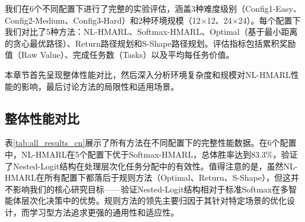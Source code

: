 \documentclass[12pt,a4paper]{article}
\begin{document}
我们在6个不同配置下进行了完整的实验评估，涵盖3种难度级别（Config1-Easy、Config2-Medium、Config3-Hard）和2种环境规模（12$\times$12、24$\times$24）。每个配置下我们对比了5种方法：NL-HMARL、Softmax-HMARL、Optimal（基于最小距离的贪心最优路径）、Return路径规划和S-Shape路径规划。评估指标包括累积奖励值（Raw Value）、完成任务数（Tasks）以及平均每任务价值。

本章节首先呈现整体性能对比，然后深入分析环境复杂度和规模对NL-HMARL性能的影响，最后讨论方法的局限性和适用场景。

\subsection{整体性能对比}

表\ref{tab:all_results_cn}展示了所有方法在不同配置下的完整性能数据。在6个配置中，NL-HMARL在5个配置下优于Softmax-HMARL，总体胜率达到83.3\%，验证了Nested-Logit结构在处理层次化任务分配中的有效性。值得注意的是，虽然NL-HMARL在所有配置下都落后于规则方法（Optimal、Return、S-Shape），但这并不影响我们的核心研究目标——验证Nested-Logit结构相对于标准Softmax在多智能体层次化决策中的优势。规则方法的领先主要归因于其针对特定场景的优化设计，而学习型方法追求更强的通用性和适应性。

\begin{table}[ht]
\centering
\caption{各配置下所有方法性能对比}
\label{tab:all_results_cn}
\end{table}
\end{document}
